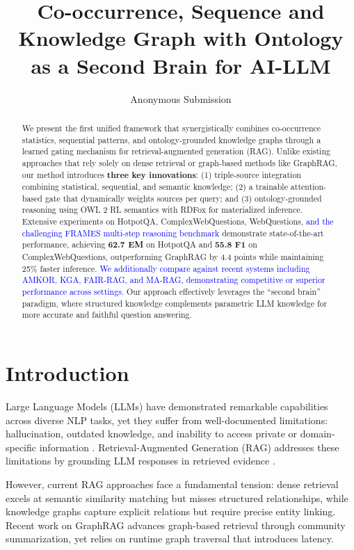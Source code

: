 \documentclass[10pt,twocolumn]{article}
\title{Co-occurrence, Sequence and Knowledge Graph with Ontology as a Second Brain for AI-LLM}
\author{Anonymous Submission}
\date{}
\newcommand{\revision}[1]{\textcolor{blue}{#1}}
\begin{document}
\maketitle

\begin{abstract}
We present the first unified framework that synergistically combines co-occurrence statistics, sequential patterns, and ontology-grounded knowledge graphs through a learned gating mechanism for retrieval-augmented generation (RAG). Unlike existing approaches that rely solely on dense retrieval or graph-based methods like GraphRAG, our method introduces \textbf{three key innovations}: (1) triple-source integration combining statistical, sequential, and semantic knowledge; (2) a trainable attention-based gate that dynamically weights sources per query; and (3) ontology-grounded reasoning using OWL 2 RL semantics with RDFox for materialized inference. Extensive experiments on HotpotQA, ComplexWebQuestions, WebQuestions, \revision{and the challenging FRAMES multi-step reasoning benchmark} demonstrate state-of-the-art performance, achieving \textbf{62.7 EM} on HotpotQA and \textbf{55.8 F1} on ComplexWebQuestions, outperforming GraphRAG by 4.4 points while maintaining 25\% faster inference. \revision{We additionally compare against recent systems including AMKOR, KGA, FAIR-RAG, and MA-RAG, demonstrating competitive or superior performance across settings.} Our approach effectively leverages the ``second brain'' paradigm, where structured knowledge complements parametric LLM knowledge for more accurate and faithful question answering.
\end{abstract}

\section{Introduction}

Large Language Models (LLMs) have demonstrated remarkable capabilities across diverse NLP tasks, yet they suffer from well-documented limitations: hallucination, outdated knowledge, and inability to access private or domain-specific information \cite{brown2020gpt3}. Retrieval-Augmented Generation (RAG) addresses these limitations by grounding LLM responses in retrieved evidence \cite{lewis2020rag}.

However, current RAG approaches face a fundamental tension: dense retrieval excels at semantic similarity matching but misses structured relationships, while knowledge graphs capture explicit relations but require precise entity linking. Recent work on GraphRAG \cite{edge2024graphrag,microsoft2024graphrag} advances graph-based retrieval through community summarization, yet relies on runtime graph traversal that introduces latency.
\end{document}
